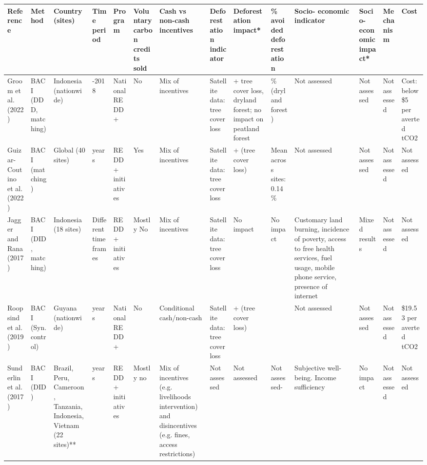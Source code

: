 \documentclass[
]{article}
\begin{document}
\begin{landscape}
\begin{table}[!h]
\begin{threeparttable}
\begin{tabular}{>{\raggedright\arraybackslash}p{4em}|>{\raggedright\arraybackslash}p{4em}|>{\raggedright\arraybackslash}p{5em}|>{\raggedright\arraybackslash}p{4em}|>{\raggedright\arraybackslash}p{4em}|>{\raggedright\arraybackslash}p{4em}|>{\raggedright\arraybackslash}p{6em}|>{\raggedright\arraybackslash}p{6em}|>{\raggedright\arraybackslash}p{6em}|>{\raggedright\arraybackslash}p{5em}|>{\raggedright\arraybackslash}p{5em}|>{\raggedright\arraybackslash}p{5em}|>{\raggedright\arraybackslash}p{5em}|>{\raggedright\arraybackslash}p{4em}}
\hline
\textbf{Reference} & \textbf{Method} & \textbf{Country (sites)} & \textbf{Time period} & \textbf{Program} & \textbf{Voluntary carbon credits sold} & \textbf{Cash vs non-cash incentives} & \textbf{Deforestation indicator} & \textbf{Deforestation impact*} & \textbf{\% avoided deforestation} & \textbf{Socio- economic indicator} & \textbf{Socio- economic impact*} & \textbf{Mechanism} & \textbf{Cost}\\
\hline
Groom et al. (2022) & BACI (DDD, matching) & Indonesia (nationwide) & 2011-2018 & National REDD+ & No & Mix of incentives & Satellite data: tree cover loss & + tree cover loss, dryland forest; no impact on peatland forest & 0.65\% (dryland forest) & Not assessed & Not assessed & Not assessed & Cost: below \$5 per averted tCO2\\
Guizar-Coutino et al. (2022) & BACI (matching) & Global (40 sites) & 5 years & REDD+ initiatives & Yes & Mix of incentives & Satellite data: tree cover loss & + (tree cover loss) & Mean across sites: 0.14\% & Not assessed & Not assessed & Not assessed & Not assessed\\
Jagger and Rana (2017) & BACI (DID, matching) & Indonesia (18 sites) & Different time frames & REDD+ initiatives & Mostly No & Mix of incentives & Satellite data: tree cover loss & No impact & No impact & Customary land burning, incidence of poverty, access to free health services, fuel usage, mobile phone service, presence of internet & Mixed results & Not assessed & Not assessed\\
Roopsind et al. (2019) & BACI (Syn. control) & Guyana (nationwide) & 5 years & National REDD+ & No & Conditional cash/non-cash & Satellite data: tree cover loss & + (tree cover loss) & 0.00031 & Not assessed & Not assessed & Not assessed & \$19.53 per averted tCO2\\
Sunderlin et al. (2017) & BACI (DID) & Brazil, Peru, Cameroon, Tanzania, Indonesia, Vietnam (22 sites)** & 2 years & REDD+ initiatives & Mostly no & Mix of incentives (e.g. livelihoods intervention) and disincentives (e.g. fines, access restrictions) & Not assessed & Not assessed & Not assessed- & Subjective well-being. Income sufficiency & No impact & Not assessed & Not assessed\\

\end{tabular}
\end{threeparttable}
\end{table}
\end{landscape}
\end{document}
